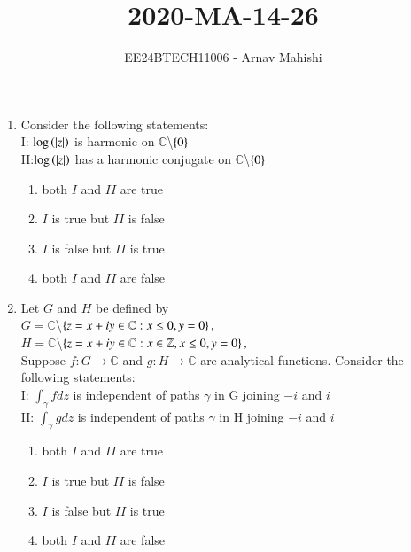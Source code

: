 \documentclass[journal]{IEEEtran}
\begin{document}

\vspace{3cm}

\title{2020-MA-14-26}
\author{EE24BTECH11006 - Arnav Mahishi}
{\let\newpage\relax\maketitle}
\begin{enumerate}
\item{
Consider the following statements:\\
I: $\log\left(\left\vert z\right\vert\right)$ is harmonic on $\mathbb{C}$\textbackslash$\left\{0\right\}$\\
II:$\log\left(\left\vert z\right\vert\right)$ has a harmonic conjugate on $\mathbb{C}$\textbackslash$\left\{0\right\}$
\begin{multicols}{2}
\begin{enumerate}
\item both $I$ and $II$ are true
\item $I$ is true but $II$ is false
\item $I$ is false but $II$ is true
\item both $I$ and $II$ are false
\end{enumerate}
\end{multicols}
}
\item{
Let $G$ and $H$ be defined by\\
$G=\mathbb{C}$\textbackslash$\left\{z=x+iy\in\mathbb{C}:x\leq 0,y=0\right\},$\\
$H=\mathbb{C}$\textbackslash$\left\{z=x+iy\in\mathbb{C}:x\in\mathbb{Z},x\leq 0,y=0\right\},$\\
Suppose $f:G\rightarrow\mathbb{C}$ and $g:H\rightarrow\mathbb{C}$ are analytical functions. Consider the following statements:\\
I: $\int_{\gamma}fdz$ is independent of paths $\gamma$ in G joining $-i$ and $i$\\
II: $\int_{\gamma}gdz$ is independent of paths $\gamma$ in H joining $-i$ and $i$
\begin{multicols}{2}
\begin{enumerate}
\item both $I$ and $II$ are true
\item $I$ is true but $II$ is false
\item $I$ is false but $II$ is true
\item both $I$ and $II$ are false

\end{enumerate}
\end{multicols}}
\end{enumerate}
\end{document}
